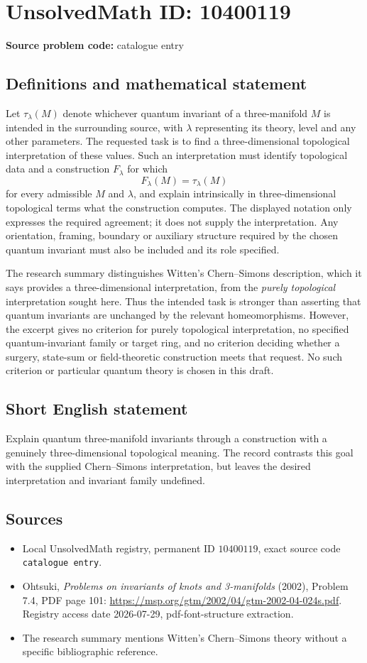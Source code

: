 \documentclass[11pt]{article}
\begin{document}
\section*{UnsolvedMath ID: 10400119}
\textbf{Source problem code:} catalogue entry
\subsection{Definitions and mathematical statement}
Let \(\tau_\lambda(M)\) denote whichever quantum invariant of a three-manifold \(M\) is intended in the surrounding source, with \(\lambda\) representing its theory, level and any other parameters. The requested task is to find a three-dimensional topological interpretation of these values. Such an interpretation must identify topological data and a construction \(F_\lambda\) for which
\[F_\lambda(M)=\tau_\lambda(M)\]
for every admissible \(M\) and \(\lambda\), and explain intrinsically in three-dimensional topological terms what the construction computes. The displayed notation only expresses the required agreement; it does not supply the interpretation. Any orientation, framing, boundary or auxiliary structure required by the chosen quantum invariant must also be included and its role specified.

The research summary distinguishes Witten's Chern--Simons description, which it says provides a three-dimensional interpretation, from the \emph{purely topological} interpretation sought here. Thus the intended task is stronger than asserting that quantum invariants are unchanged by the relevant homeomorphisms. However, the excerpt gives no criterion for purely topological interpretation, no specified quantum-invariant family or target ring, and no criterion deciding whether a surgery, state-sum or field-theoretic construction meets that request. No such criterion or particular quantum theory is chosen in this draft.
\subsection{Short English statement}
Explain quantum three-manifold invariants through a construction with a genuinely three-dimensional topological meaning. The record contrasts this goal with the supplied Chern--Simons interpretation, but leaves the desired interpretation and invariant family undefined.
\subsection{Sources}
\begin{itemize}
\item Local UnsolvedMath registry, permanent ID \(10400119\), exact source code \texttt{catalogue entry}.
\item Ohtsuki, \emph{Problems on invariants of knots and 3-manifolds} (2002), Problem 7.4, PDF page 101: \url{https://msp.org/gtm/2002/04/gtm-2002-04-024s.pdf}. Registry access date 2026-07-29, pdf-font-structure extraction.
\item The research summary mentions Witten's Chern--Simons theory without a specific bibliographic reference.
\end{itemize}
\end{document}
